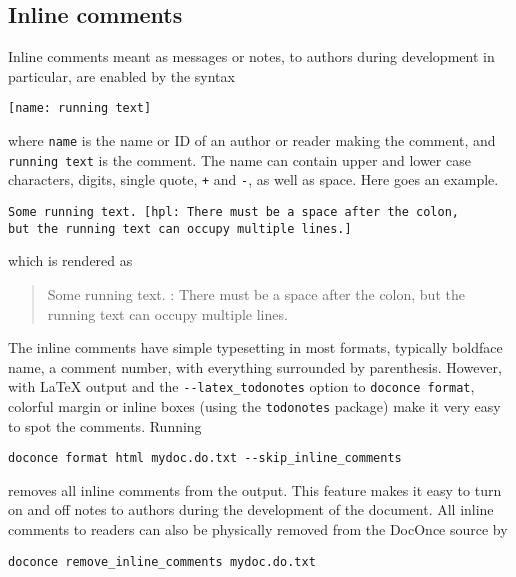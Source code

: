\documentclass[%
oneside,                 %
final,                   %
10pt]{article}
\newcounter{doconce:movie:counter}
\newcommand{\shortinlinecomment}[3]{{\color{red}{\bf #1}: #2}}
\begin{document}
\subsection{Inline comments}
Inline comments meant as messages or notes, to authors during development
in particular,
are enabled by the syntax
\begin{Verbatim}[numbers=none,fontsize=\fontsize{9pt}{9pt},baselinestretch=0.95,xleftmargin=2mm]
[name: running text]

\end{Verbatim}

where \texttt{name} is the name or ID of an author or reader making the comment,
and \texttt{running text} is the comment. The name can contain upper and lower
case characters, digits, single quote, \texttt{+} and \texttt{-}, as well
as space. Here goes an example.
\begin{Verbatim}[numbers=none,fontsize=\fontsize{9pt}{9pt},baselinestretch=0.95,xleftmargin=2mm]
Some running text. [hpl: There must be a space after the colon,
but the running text can occupy multiple lines.]

\end{Verbatim}

which is rendered as

\begin{quote}
Some running text. \shortinlinecomment{hpl 1}{ There must be a space after the colon, but the running text can occupy multiple lines. }{ There must be a }
\end{quote}

The inline comments have simple typesetting in most formats, typically
boldface name, a comment number, with everything surrounded by
parenthesis.  However, with {\LaTeX} output and the \Verb!--latex_todonotes!
option to \texttt{doconce format}, colorful margin or inline boxes (using the
\texttt{todonotes} package) make it very easy to spot the comments.
Running
\begin{Verbatim}[numbers=none,fontsize=\fontsize{9pt}{9pt},baselinestretch=0.95,xleftmargin=2mm]
doconce format html mydoc.do.txt --skip_inline_comments

\end{Verbatim}

removes all inline comments from the output. This feature makes it easy
to turn on and off notes to authors during the development of the document.
All inline comments to readers can also be physically
removed from the DocOnce source by
\begin{Verbatim}[numbers=none,fontsize=\fontsize{9pt}{9pt},baselinestretch=0.95,xleftmargin=2mm]
doconce remove_inline_comments mydoc.do.txt

\end{Verbatim}
\end{document}
